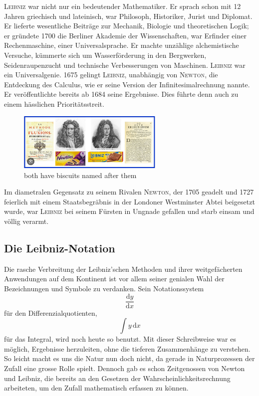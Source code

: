 \documentclass[%
11pt,%
twoside,%
titlepage,%
german,%
headsepline%
]{scrartcl}
\theoremstyle{definition}
\theoremstyle{plain}
\begin{document}
\textsc{Leibniz} war nicht nur ein bedeutender Mathematiker. Er sprach schon mit 12 Jahren griechisch und lateinisch, war Philosoph, Historiker, Jurist und Diplomat. Er lieferte wesentliche Beiträge zur Mechanik, Biologie und theoretischen Logik; er gründete 1700 die Berliner Akademie der Wissenschaften, war Erfinder einer Rechenmaschine, einer Universalsprache. Er machte unzählige alchemistische Versuche, kümmerte sich um Wasserförderung in den Bergwerken, Seidenraupenzucht und technische Verbesserungen von Maschinen. \textsc{Leibniz} war ein Universalgenie. 1675 gelingt \textsc{Leibniz}, unabhängig von \textsc{Newton}, die Entdeckung des \glqq Calculus\grqq, wie er seine Version der Infinitesimalrechnung nannte. Er veröffentlichte bereits ab 1684 seine Ergebnisse. Dies führte denn auch zu einem hässlichen Prioritätsstreit.
\begin{figure}
    \centering
    \includegraphics[width=0.62\textwidth]{pictures/newton_and_leibiz.jpeg}
    \caption{both have biscuits named after them}
    \label{fig:leibnizandnewton}
\end{figure}
Im diametralen Gegensatz zu seinem Rivalen \textsc{Newton}, der 1705 geadelt und 1727 feierlich mit einem Staatsbegräbnis in der Londoner Westminster Abtei beigesetzt wurde, war \textsc{Leibniz} bei seinem Fürsten in Ungnade gefallen und starb einsam und völlig verarmt.

\subsection{Die Leibniz-Notation}

Die rasche Verbreitung der Leibniz'schen Methoden und ihrer weitgefächerten Anwendungen auf dem Kontinent ist vor allem seiner genialen Wahl der Bezeichnungen und Symbole zu verdanken. Sein Notationssystem
$$\frac{\mathrm{d}y}{\mathrm{d}x}$$
für den Differenzialquotienten,
$$\int y\,\mathrm{d}x$$
für das Integral, wird noch heute so benutzt. Mit dieser Schreibweise war es möglich, Ergebnisse herzuleiten, ohne die tieferen Zusammenhänge zu verstehen.
So leicht macht es uns die Natur nun doch nicht, da gerade in Naturprozessen der Zufall eine grosse Rolle spielt. Dennoch gab es schon Zeitgenossen von Newton und Leibniz, die bereits an den Gesetzen der Wahrscheinlichkeitsrechnung arbeiteten, um den Zufall mathematisch erfassen zu können.
\end{document}

